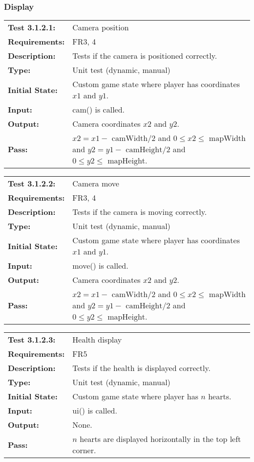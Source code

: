\documentclass[12pt, titlepage]{article}
\begin{document}
\subsubsection{Display}

\begin{tabular}{|l|p{10cm}|}
    \hline
    \bf{Test} 3.1.2.1: & Camera position \\
    \bf{Requirements}: & FR3, 4 \\
    \bf{Description}: & Tests if the camera is positioned correctly. \\
    \bf{Type}: & Unit test (dynamic, manual) \\
    \bf{Initial State}: & Custom game state where player has coordinates $x1$ and $y1$. \\
    \bf{Input}: & cam() is called. \\
    \bf{Output}: & Camera coordinates $x2$ and $y2$. \\
    \bf{Pass}: & $x2 = x1 - \text{ camWidth}/2 $ and $0 \leq x2 \leq \text{ mapWidth}$ and $y2 = y1 - \text{ camHeight}/2 $ and $0 \leq y2 \leq \text{ mapHeight}$. \\
    \hline
\end{tabular}

\begin{tabular}{|l|p{10cm}|}
    \hline
    \bf{Test} 3.1.2.2: & Camera move \\
    \bf{Requirements}: & FR3, 4 \\
    \bf{Description}: & Tests if the camera is moving correctly. \\
    \bf{Type}: & Unit test (dynamic, manual) \\
    \bf{Initial State}: & Custom game state where player has coordinates $x1$ and $y1$. \\
    \bf{Input}: & move() is called. \\
    \bf{Output}: & Camera coordinates $x2$ and $y2$. \\
    \bf{Pass}: & $x2 = x1 - \text{ camWidth}/2 $ and $0 \leq x2 \leq \text{ mapWidth}$ and $y2 = y1 - \text{ camHeight}/2 $ and $0 \leq y2 \leq \text{ mapHeight}$. \\
    \hline
\end{tabular}

\begin{tabular}{|l|p{10cm}|}
    \hline
    \bf{Test} 3.1.2.3: & Health display \\
    \bf{Requirements}: & FR5 \\
    \bf{Description}: & Tests if the health is displayed correctly. \\
    \bf{Type}: & Unit test (dynamic, manual) \\
    \bf{Initial State}: & Custom game state where player has $n$ hearts. \\
    \bf{Input}: & ui() is called. \\
    \bf{Output}: & None. \\
    \bf{Pass}: & $n$ hearts are displayed horizontally in the top left corner. \\
    \hline
\end{tabular}
\end{document}
